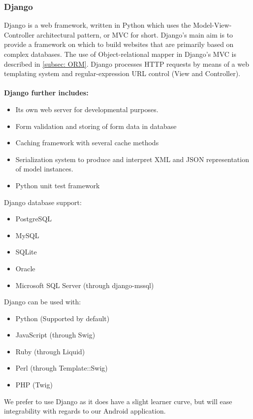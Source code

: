 \documentclass{article}
\begin{document}
	\subsubsection{Django}\label{subsec: Django}
	Django is a web framework, written in Python which uses the Model-View-Controller architectural pattern, or MVC for short.
	Django's main aim is to provide a framework on which to build websites that are primarily based on complex databases.
	The use of Object-relational mapper in Django's MVC is described in \ref{subsec: ORM}. Django processes HTTP requests by means of a web templating system and regular-expression URL control (View and Controller).
	\\ \\
	\textbf{Django further includes:}
	\begin{itemize}
		\item Its own web server for developmental purposes.
		\item Form validation and storing of form data in database
		\item Caching framework with several cache methods
		\item Serialization system to produce and interpret XML and JSON representation of model instances.
		\item Python unit test framework
	\end{itemize}
	Django database support:
	\begin{itemize}
		\item PostgreSQL
		\item MySQL
		\item SQLite
		\item Oracle
		\item Microsoft SQL Server (through django-mssql)
	\end{itemize}
	Django can be used with:
	\begin{itemize}
		\item Python (Supported by default)
		\item JavaScript (through Swig)
		\item Ruby (through Liquid)
		\item Perl (through Template::Swig)
		\item PHP (Twig)
	\end{itemize}

	We prefer to use Django as it does have a slight learner curve, but will ease integrability with regards to our Android application.
	
	
\end{document}
